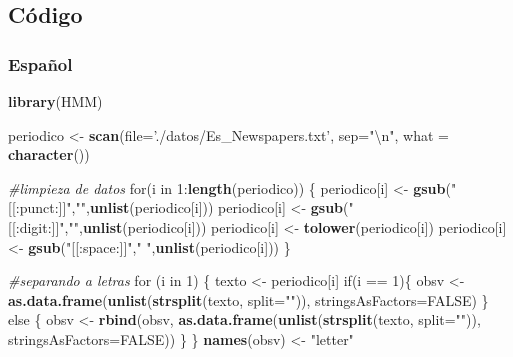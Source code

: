 \documentclass[]{article}
\newenvironment{Shaded}{\begin{snugshade}}{\end{snugshade}}
\newcommand{\KeywordTok}[1]{\textcolor[rgb]{0.13,0.29,0.53}{\textbf{{#1}}}}
\newcommand{\DataTypeTok}[1]{\textcolor[rgb]{0.13,0.29,0.53}{{#1}}}
\newcommand{\DecValTok}[1]{\textcolor[rgb]{0.00,0.00,0.81}{{#1}}}
\newcommand{\CharTok}[1]{\textcolor[rgb]{0.31,0.60,0.02}{{#1}}}
\newcommand{\StringTok}[1]{\textcolor[rgb]{0.31,0.60,0.02}{{#1}}}
\newcommand{\CommentTok}[1]{\textcolor[rgb]{0.56,0.35,0.01}{\textit{{#1}}}}
\newcommand{\OtherTok}[1]{\textcolor[rgb]{0.56,0.35,0.01}{{#1}}}
\newcommand{\NormalTok}[1]{{#1}}
\begin{document}
\pagebreak

\subsection{Código}\label{codigo}

\subsubsection{Español}\label{espanol}

\begin{Shaded}
\begin{Highlighting}[]
\KeywordTok{library}\NormalTok{(HMM)}

\NormalTok{periodico <-}\StringTok{ }\KeywordTok{scan}\NormalTok{(}\DataTypeTok{file=}\StringTok{'./datos/Es_Newspapers.txt'}\NormalTok{, }\DataTypeTok{sep=}\StringTok{"}\CharTok{\textbackslash{}n}\StringTok{"}\NormalTok{, }\DataTypeTok{what =} \KeywordTok{character}\NormalTok{())}

\CommentTok{#limpieza de datos}
\NormalTok{for(i in }\DecValTok{1}\NormalTok{:}\KeywordTok{length}\NormalTok{(periodico)) \{}
  \NormalTok{periodico[i] <-}\StringTok{ }\KeywordTok{gsub}\NormalTok{(}\StringTok{"[[:punct:]]"}\NormalTok{,}\StringTok{""}\NormalTok{,}\KeywordTok{unlist}\NormalTok{(periodico[i]))}
  \NormalTok{periodico[i] <-}\StringTok{ }\KeywordTok{gsub}\NormalTok{(}\StringTok{"[[:digit:]]"}\NormalTok{,}\StringTok{""}\NormalTok{,}\KeywordTok{unlist}\NormalTok{(periodico[i]))}
  \NormalTok{periodico[i] <-}\StringTok{ }\KeywordTok{tolower}\NormalTok{(periodico[i])}
  \NormalTok{periodico[i] <-}\StringTok{ }\KeywordTok{gsub}\NormalTok{(}\StringTok{"[[:space:]]"}\NormalTok{,}\StringTok{" "}\NormalTok{,}\KeywordTok{unlist}\NormalTok{(periodico[i]))}
\NormalTok{\}}


\CommentTok{#separando a letras}
\NormalTok{for (i in }\DecValTok{1}\NormalTok{) \{}
  \NormalTok{texto <-}\StringTok{ }\NormalTok{periodico[i]}
  \NormalTok{if(i ==}\StringTok{ }\DecValTok{1}\NormalTok{)\{}
    \NormalTok{obsv <-}\StringTok{ }\KeywordTok{as.data.frame}\NormalTok{(}\KeywordTok{unlist}\NormalTok{(}\KeywordTok{strsplit}\NormalTok{(texto, }\DataTypeTok{split=}\StringTok{""}\NormalTok{)), }\DataTypeTok{stringsAsFactors=}\OtherTok{FALSE}\NormalTok{)}
  \NormalTok{\} else \{}
    \NormalTok{obsv <-}\StringTok{ }\KeywordTok{rbind}\NormalTok{(obsv, }\KeywordTok{as.data.frame}\NormalTok{(}\KeywordTok{unlist}\NormalTok{(}\KeywordTok{strsplit}\NormalTok{(texto, }\DataTypeTok{split=}\StringTok{""}\NormalTok{)), }\DataTypeTok{stringsAsFactors=}\OtherTok{FALSE}\NormalTok{))}
  \NormalTok{\}}
\NormalTok{\}}
\KeywordTok{names}\NormalTok{(obsv) <-}\StringTok{ "letter"}



\end{Highlighting}
\end{Shaded}
\end{document}
